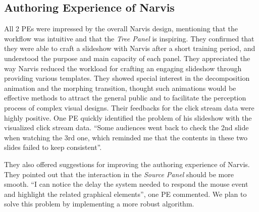 \subsection{Authoring Experience of Narvis}
All 2 PEs were impressed by the overall Narvis design, mentioning that the workflow was intuitive and that the \textit{Tree Panel} is inspiring. They confirmed that they were able to craft a slideshow with Narvis after a short training period, and understood the purpose and main capacity of each panel. 
They appreciated the way Narvis reduced the workload for crafting an engaging slideshow through providing various templates. They showed special interest in the decomposition animation and the morphing transition, thought such animations would be effective methods to attract the general public and to facilitate the perception process of complex visual designs.  
Their feedbacks for the  click stream data were highly positive. One PE quickly identified the problem of his slideshow with the visualized click stream data. ``Some audiences went back to check the 2nd slide when watching the 3rd one, which reminded me that the contents in these two slides failed to keep consistent''.

They also offered suggestions for improving the authoring experience of Narvis. They pointed out that the interaction in the \textit{Source Panel} should be more smooth. ``I can notice the delay the system needed to respond the mouse event and highlight the related graphical elements'', one PE commented. We plan to solve this problem by implementing a more robust algorithm. 

